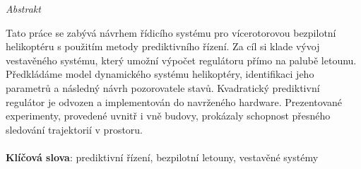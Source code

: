 \vfill
\begin{center}
{\it \large Abstrakt}
\vspace{0.2cm}

\begin{minipage}{0.8\textwidth}{
Tato práce se zabývá návrhem řídicího systému pro vícerotorovou bezpilotní helikoptéru s použitím metody prediktivního řízení. Za cíl si klade vývoj vestavěného systému, který umožní výpočet regulátoru přímo na palubě letounu. Předkládáme model dynamického systému helikoptéry, identifikaci jeho parametrů a následný návrh pozorovatele stavů. \-Kvadratický prediktivní regulátor je odvozen a implementován do navrženého hardware. Prezentované experimenty, provedené uvnitř i vně budovy, prokázaly schopnost přesného sledování trajektorií v prostoru.
\\
\\
\textbf{Klíčová slova}: prediktivní řízení, bezpilotní letouny, vestavěné systémy
}
\end{minipage}
\end{center}
\vfill
\vspace{1cm}
\newpage{}